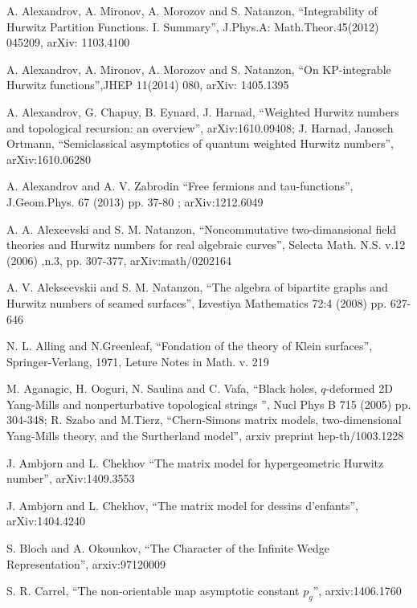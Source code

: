 \documentclass[a4paper,10pt]{article}
\theoremstyle{plain}
\theoremstyle{remark}
\begin{document}
\begin{thebibliography}{99}


 A. Alexandrov, A. Mironov, A. Morozov and S. Natanzon,
``Integrability of Hurwitz Partition Functions.
I. Summary'', J.Phys.A: Math.Theor.45(2012) 045209,  arXiv: 1103.4100

 A. Alexandrov, A. Mironov, A. Morozov and S. Natanzon,
``On KP-integrable Hurwitz functions'',JHEP 11(2014) 080,  arXiv: 1405.1395

   A. Alexandrov, G. Chapuy, B. Eynard, J. Harnad, ``Weighted Hurwitz numbers 
and topological recursion: an overview'', arXiv:1610.09408;   J. Harnad, Janosch Ortmann, 
``Semiclassical asymptotics of quantum weighted Hurwitz numbers'', arXiv:1610.06280
    
 A. Alexandrov and A. V. Zabrodin ``Free fermions and tau-functions'',
 J.Geom.Phys. 67 (2013) pp. 37-80 ;   arXiv:1212.6049


 A. A. Alexeevski and S. M. Natanzon, ``Noncommutative two-dimansional field theories and Hurwitz numbers for real
algebraic curves'', Selecta Math. N.S. v.12 (2006) ,n.3, pp. 307-377, arXiv:math/0202164

 A. V. Alekseevskii and S. M. Natanzon, ``The algebra of bipartite graphs and Hurwitz numbers of seamed surfaces'',
Izvestiya Mathematics 72:4 (2008) pp. 627-646


 N. L. Alling and N.Greenleaf, ``Fondation of the theory of Klein surfaces'', Springer-Verlang, 1971,
Leture Notes in Math. v. 219


 M. Aganagic, H. Ooguri, N. Saulina and C. Vafa, ``Black holes, $q$-deformed 2D Yang-Mills and nonperturbative
topological strings '', Nucl Phys B 715 (2005) pp. 304-348;
R. Szabo and M.Tierz, ``Chern-Simons matrix models, two-dimensional Yang-Mills theory, and the Surtherland model'',
arxiv preprint hep-th/1003.1228

 J. Ambjorn and L. Chekhov ``The matrix model for hypergeometric Hurwitz number'',
arXiv:1409.3553

 J. Ambjorn and L. Chekhov, ``The matrix model for dessins d'enfants'', arXiv:1404.4240

 S. Bloch and A. Okounkov, ``The Character of the Infinite Wedge
Representation'', arxiv:97120009

 S. R. Carrel, ``The non-orientable map asymptotic constant $p_g$'', arxiv:1406.1760


\end{thebibliography}
\end{document}
